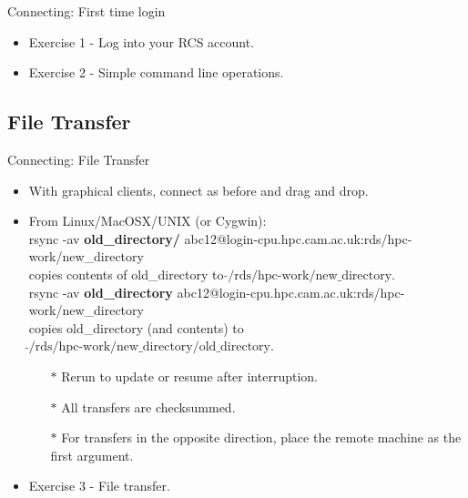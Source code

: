\begin{frame}[fragile]{Connecting: First time login}
\begin{itemize}
\item{Exercise 1 - Log into your RCS account.}
  \pause
  \item{Exercise 2 - Simple command line operations.}
\end{itemize}
\end{frame}

\subsection{File Transfer}
\begin{frame}{Connecting: File Transfer}
\begin{itemize}
\item With graphical clients, connect as before and drag and drop.
\pause
\item From Linux/MacOSX/UNIX (or Cygwin):\hfill\\
\alert{\footnotesize rsync -av \textbf{old\_directory/} abc12@login-cpu.hpc.cam.ac.uk:rds/hpc-work/new\_directory}\hfill\\
copies contents of old\_directory to $\tilde{}\text{/rds/hpc-work/new\_directory}$.\hfill\\\smallskip
\pause
\alert{\footnotesize rsync -av \textbf{old\_directory} abc12@login-cpu.hpc.cam.ac.uk:rds/hpc-work/new\_directory}\hfill\\
copies old\_directory (and contents) to $\tilde{}\text{/rds/hpc-work/new\_directory/old\_directory}$.\hfill\\
\pause
\begin{itemize}
\item[$\ast$]Rerun to update or resume after interruption.
\item[$\ast$]All transfers are checksummed.
\item[$\ast$]For transfers in the opposite direction, place the remote machine as the first argument.
\end{itemize}
\pause
\item{Exercise 3 - File transfer.}
\end{itemize}
\end{frame}

